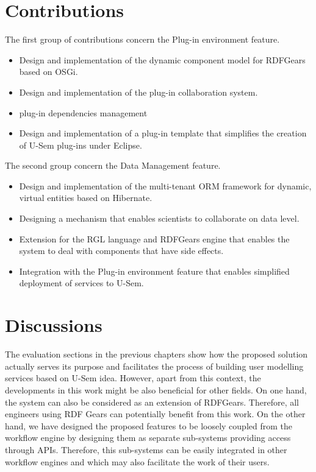 \section{Contributions}

The first group of contributions concern the Plug-in environment feature.
\begin{itemize}
	\item Design and implementation of the dynamic component model for RDFGears based on OSGi.
	\item Design and implementation of the plug-in collaboration system.
	\item plug-in dependencies management
	\item Design and implementation of a plug-in template that simplifies the creation of U-Sem plug-ins under Eclipse.
\end{itemize}

The second group concern the Data Management feature.
\begin{itemize}
	\item Design and implementation of the multi-tenant ORM framework for dynamic, virtual entities based on Hibernate.
	\item Designing a mechanism that enables scientists to collaborate on data level.
	\item Extension for the RGL language and RDFGears engine that enables the system to deal with components that have side effects.
	\item Integration with the Plug-in environment feature that enables simplified deployment of services to U-Sem.
\end{itemize}


\section{Discussions}
\label{sec:concDisc}

The evaluation sections in the previous chapters show how the proposed solution actually serves its purpose and facilitates the process of building user modelling services based on U-Sem idea. However, apart from this context, the developments in this work might be also beneficial for other fields. On one hand, the system can also be considered as an extension of RDFGears. Therefore, all engineers using RDF Gears can potentially benefit from this work. On the other hand, we have designed the proposed features to be loosely coupled from the workflow engine by designing them as separate sub-systems providing access through APIs. Therefore, this sub-systems can be easily integrated in other workflow engines and which may also facilitate the work of their users.

